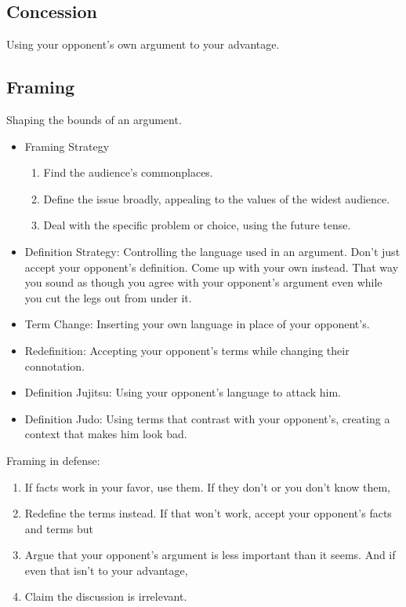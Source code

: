\subsection{Concession}
Using your opponent's own argument to your advantage.

\subsection{Framing}
Shaping the bounds of an argument. 

\begin{itemize}
	\item Framing Strategy
		\begin{enumerate}
			\item Find the audience's commonplaces.
			\item Define the issue broadly, appealing to the values of the widest audience.
			\item Deal with the specific problem or choice, using the future tense.
		\end{enumerate}
	\item Definition Strategy: Controlling the language used in an argument. Don't just accept your opponent's definition. Come up with your own instead. That way you sound as though you agree with your opponent's argument even while you cut the legs out from under it. 
	\item Term Change: Inserting your own language in place of your opponent's.
	\item Redefinition: Accepting your opponent's terms while changing their connotation.
	\item Definition Jujitsu: Using your opponent's language to attack him.
	\item Definition Judo: Using terms that contrast with your opponent's, creating a context that makes him look bad.
\end{itemize}

Framing in defense:
\begin{enumerate}
	\item If facts work in your favor, use them. If they don't or you don't know them,
	\item Redefine the terms instead. If that won't work, accept your opponent's facts and terms but
	\item Argue that your opponent's argument is less important than it seems. And if even that isn't to your advantage,
	\item Claim the discussion is irrelevant.
\end{enumerate}

